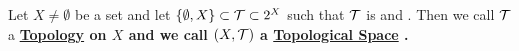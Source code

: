 
\newcommand{\scTopologicalSpace}[2]{
    \pa{#1, \scTopology{#1}{#2}}
}
\newcommand{\scTopology}[2]{
    #2_{#1}
}
\newcommand{\TopologicalSpace}[0]{
    \bf \hyperref[def:TopologicalSpace]{Topological Space} \rm
}
\newcommand{\Topology}[0]{
        \bf \hyperref[def:TopologicalSpace]{Topology} \rm
}
\newcommand{\TopologicalSpaces}[0]{
    \bf \hyperref[def:TopologicalSpace]{Topological Spaces} \rm
}
\newcommand{\Topologies}[0]{
        \bf \hyperref[def:TopologicalSpace]{Topologies} \rm
}

\begin{df}
    \label{def:TopologicalSpace}
    Let $X \neq \emptyset$ be a set 
    and let $\{\emptyset, X\} \subset \mathcal{T} \subset 2^X$ such that
    $\mathcal{T}$ is 
    \ClosedUnderArbitraryUnions and \ClosedUnderFiniteIntersections. 
    Then we call $\mathcal{T}$ a \Topology on $X$ and we call 
    $(X,\mathcal{T})$ a \TopologicalSpace. 
\end{df}



